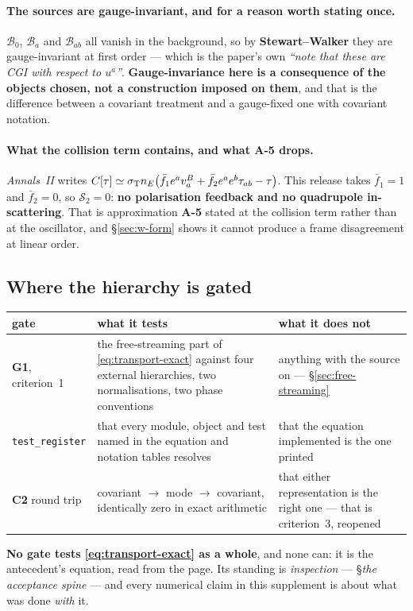 \paragraph{The sources are gauge-invariant, and for a reason worth stating
once.} $\mathcal B_0$, $\mathcal B_a$ and $\mathcal B_{ab}$ all vanish in the
background, so by \textbf{Stewart--Walker} they are gauge-invariant at first
order --- which is the paper's own \emph{``note that these are CGI with
respect to $u^a$''}. \textbf{Gauge-invariance here is a consequence of the
objects chosen, not a construction imposed on them}, and that is the
difference between a covariant treatment and a gauge-fixed one with covariant
notation.

\paragraph{What the collision term contains, and what A-5 drops.}
\emph{Annals~II} writes
$C[\tau]\simeq\sigma_{\rm T}n_E\big(\bar f_1e^av^B_a+\bar f_2e^ae^b\tau_{ab}
-\tau\big)$. This release takes $\bar f_1=1$ and $\bar f_2=0$, so
$\mathcal S_2=0$: \textbf{no polarisation feedback and no quadrupole
in-scattering}. That is approximation \textbf{A-5} stated at the collision
term rather than at the oscillator, and \S\ref{sec:w-form} shows it cannot
produce a frame disagreement at linear order.

\subsection{Where the hierarchy is gated}

\begin{center}\small
\begin{tabularx}{\textwidth}{@{}l >{\raggedright\arraybackslash}X l@{}}
\toprule
\textbf{gate} & \textbf{what it tests} & \textbf{what it does not} \\
\midrule
\textbf{G1}, criterion~1 & the free-streaming part of
  \eqref{eq:transport-exact} against four external hierarchies, two
  normalisations, two phase conventions & anything with the source on ---
  \S\ref{sec:free-streaming} \\
\texttt{test\_register} & that every module, object and test named in the
  equation and notation tables resolves & that the equation implemented is
  the one printed \\
\textbf{C2} round trip & covariant $\to$ mode $\to$ covariant, identically
  zero in exact arithmetic & that either representation is the right one ---
  that is criterion~3, reopened \\
\bottomrule
\end{tabularx}
\end{center}

\noindent
\textbf{No gate tests \eqref{eq:transport-exact} as a whole}, and none can:
it is the antecedent's equation, read from the page. Its standing is
\emph{inspection} --- \S\emph{the acceptance spine} ---  and every numerical
claim in this supplement is about what was done \emph{with} it.
